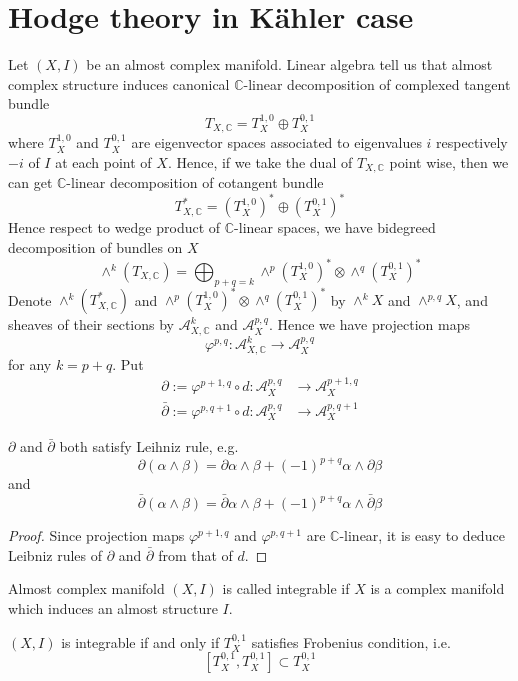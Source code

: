 \documentclass[11pt,oneside,a4paper]{amsart}
\begin{document}
\section{Hodge theory in K\"ahler case}
Let $(X,I)$ be an almost complex manifold. Linear algebra tell us that almost complex structure induces canonical $\mathbb{C}$-linear decomposition of complexed tangent bundle
\[
T_{X,\mathbb{C}}= T_{X}^{1,0} \oplus T_X^{0,1}
\]
where $T_X^{1,0}$ and $T_X^{0,1}$ are eigenvector spaces associated to eigenvalues $i$ respectively $-i$ of $I$ at each point of $X$. Hence, if we take the dual of $T_{X,\mathbb{C}}$ point wise, then we can get $\mathbb{C}$-linear decomposition of cotangent bundle
\[
T_{X,\mathbb{C}}^* = (T_X^{1,0})^* \oplus (T_X^{0,1})^*
\]
 Hence respect to wedge product of $\mathbb{C}$-linear spaces, we have bidegreed decomposition of bundles on $X$
\[
\wedge^k(T_{X,\mathbb{C}}) = \bigoplus_{p+q=k}\wedge^p (T_X^{1,0})^* \otimes \wedge^q (T_{X}^{0,1})^*
\]
Denote $\wedge^k(T_{X,\mathbb{C}}^*)$ and $\wedge^p(T_X^{1,0})^* \otimes \wedge^q(T_X^{0,1})^*$  by $\wedge^k X$ and $\wedge^{p,q}X$, and sheaves of their sections by $\mathcal{A}^k_{X,\mathbb{C}}$ and $\mathcal{A}^{p,q}_{X}$. Hence we have projection maps
\[
\varphi^{p,q}: \mathcal{A}^{k}_{X,\mathbb{C}} \rightarrow \mathcal{A}^{p,q}_X
\]
for any $k= p+q$. Put 
\[
\begin{aligned}
\partial:= \varphi^{p+1,q} \circ d : \mathcal{A}^{p,q}_{X} &\rightarrow \mathcal{A}^{p+1,q}_{X}  \\
\bar{\partial}:= \varphi^{p,q+1} \circ d: \mathcal{A}^{p,q}_X &\rightarrow \mathcal{A}^{p,q+1}_X
\end{aligned}
\]
\begin{seclemma}
	$\partial$ and $\bar{\partial}$ both satisfy Leihniz rule, e.g.
	\[
	\partial(\alpha \wedge \beta) = \partial{\alpha} \wedge \beta +(-1)^{p+q} \alpha \wedge \partial{\beta}
	\]
	and
	\[
	\bar{\partial}(\alpha \wedge \beta) = \bar{\partial}\alpha \wedge \beta + (-1)^{p+q}\alpha \wedge \bar{\partial} \beta
	\]
\end{seclemma}
\begin{proof}
	Since projection maps $\varphi^{p+1,q}$ and $\varphi^{p,q+1}$ are $\mathbb{C}$-linear, it is easy to deduce Leibniz rules of $\partial$ and $\bar{\partial}$ from that of $d$.
\end{proof}
\begin{secdefn}
	Almost complex manifold $(X,I)$ is called integrable if $X$ is a complex manifold which induces an almost structure $I$.
\end{secdefn}
\begin{secthm}
	$(X,I)$ is integrable if and only if $T_X^{0,1}$ satisfies Frobenius condition, i.e.
	\[
	[T_X^{0,1}, T_X^{0,1}] \subset T_X^{0,1}
	\]
\end{secthm}
\end{document}
